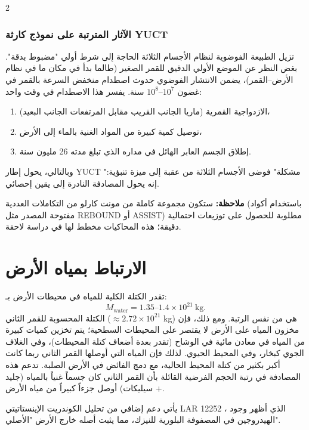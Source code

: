 \documentclass[11pt,a4paper]{article}
\begin{document}
\begin{multicols}{2}
		\subsubsection{الآثار المترتبة على نموذج كارثة YUCT}
		تزيل الطبيعة الفوضوية لنظام الأجسام الثلاثة الحاجة إلى شرط أولي "مضبوط بدقة". بغض النظر عن الموضع الأولي الدقيق للقمر الصغير (طالما بدأ في مكان ما في نظام الأرض–القمر)، يضمن الانتشار الفوضوي حدوث اصطدام منخفض السرعة بالقمر في غضون \(10^{7}\)–\(10^{8}\) سنة. يفسر هذا الاصطدام في وقت واحد:
		\begin{enumerate}
			\item الازدواجية القمرية (ماريا الجانب القريب مقابل المرتفعات الجانب البعيد)،
			\item توصيل كمية كبيرة من المواد الغنية بالماء إلى الأرض،
			\item إطلاق الجسم العابر الهائل في مداره الذي تبلغ مدته 26 مليون سنة.
		\end{enumerate}
		
		وبالتالي، يحول إطار YUCT "مشكلة" فوضى الأجسام الثلاثة من عقبة إلى ميزة تنبؤية: إنه يحول المصادفة النادرة إلى يقين إحصائي.
		
		\vspace{0.2cm}
		\noindent
		\textbf{ملاحظة:} ستكون مجموعة كاملة من مونت كارلو من التكاملات العددية (باستخدام أكواد مفتوحة المصدر مثل REBOUND أو ASSIST) مطلوبة للحصول على توزيعات احتمالية دقيقة؛ هذه المحاكيات مخطط لها في دراسة لاحقة.
		
		\section{الارتباط بمياه الأرض}
		تقدر الكتلة الكلية للمياه في محيطات الأرض بـ:
		\[
		M_{\text{water}} = 1.35\text{–}1.4 \times 10^{21}\ \text{kg}.
		\]
		الكتلة المحسوبة للقمر الثاني (\(\approx 2.72 \times 10^{21}\) kg) هي من نفس الرتبة. ومع ذلك، فإن مخزون المياه على الأرض لا يقتصر على المحيطات السطحية؛ يتم تخزين كميات كبيرة من المياه في معادن مائية في الوشاح (تقدر بعدة أضعاف كتلة المحيطات)، وفي الغلاف الجوي كبخار، وفي المحيط الحيوي. لذلك فإن المياه التي أوصلها القمر الثاني ربما كانت أكبر بكثير من كتلة المحيط الحالية، مع دمج الفائض في الأرض الصلبة. تدعم هذه المصادفة في رتبة الحجم الفرضية القائلة بأن القمر الثاني كان جسماً غنياً بالمياه (جليد + سيليكات) أوصل جزءاً كبيراً من مياه الأرض.
		
		يأتي دعم إضافي من تحليل الكوندريت الإينستاتيتي LAR 12252 \cite{Gardiner2025}، الذي أظهر وجود الهيدروجين في المصفوفة البلورية للنيزك، مما يثبت أصله خارج الأرض "الأصلي".
		

\end{multicols}
\end{document}
